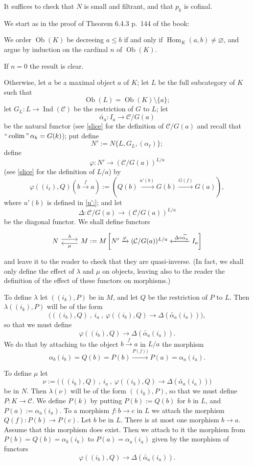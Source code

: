 \documentclass[12pt]{article}%
\theoremstyle{remark}
\theoremstyle{definition}
\newcommand{\C}{\mathcal C}
\newcommand{\pp}{\varphi}
\newcommand{\xr}{\xrightarrow}
\DeclareMathOperator*{\colim}{colim}
\DeclareMathOperator*{\ic}{``\colim"}
\DeclareMathOperator{\Hom}{Hom}%
\DeclareMathOperator{\Ind}{Ind}
\DeclareMathOperator{\Ob}{Ob}
\begin{document}
It suffices to check that $N$ is small and filtrant, and that $p_k$ is cofinal. 

We start as in the proof of Theorem 6.4.3 p.~144 of the book: 

We order $\Ob(K)$ be decreeing $a\le b$ if and only if $\Hom_K(a,b)\neq\varnothing$, and argue by induction on the cardinal $n$ of $\Ob(K)$. 

If $n=0$ the result is clear.

Otherwise, let $a$ be a maximal object $a$ of $K$; let $L$ be the full subcategory of $K$ such that 
$$
\Ob(L)=\Ob(K)\setminus\{a\};
$$ 
let $G_L:L\to\Ind(\C)$ be the restriction of $G$ to $L$; let 
$$
\widetilde{\alpha_a}:I_a\to\C/G(a)
$$ 
be the natural functor (see \eqref{slice} for the definition of $\C/G(a)$ and recall that $\ic\alpha_k=G(k)$); put define 
$$
N':=N\{L,G_L,(\alpha_\ell)\};
$$
define 
$$ 
\varphi:N'\to(\C/G(a))^{L/a} 
$$ 
(see \eqref{slice} for the definition of $L/a$) by 
$$
\varphi((i_\ell),Q)\left(b\xr f a\right):=\left(Q(b)\xr{u'(b)} G(b)\xr{G(f)}G(a)\right),
$$
where $u'(b)$ is defined in \eqref{u':}; and let 
$$
\Delta:\C/G(a)\to(\C/G(a))^{L/a}
$$ 
be the diagonal functor. We shall define functors 
$$
\begin{tikzcd}
N\ar[yshift=0.7ex]{r}{\lambda}&M:=M\left[N'\xrightarrow{\varphi}(\C/G(a))^{L/a}\xleftarrow{\ \Delta\circ\widetilde{\alpha_a}}I_a\right]\ar[yshift=-0.7ex]{l}{\mu}
\end{tikzcd}
$$ 
and leave it to the reader to check that they are quasi-inverse. (In fact, we shall only define the effect of $\lambda$ and $\mu$ on objects, leaving also to the reader the definition of the effect of these functors on morphisms.)

To define $\lambda$ let $((i_k),P)$ be in $M$, and let $Q$ be the restriction of $P$ to $L$. Then $\lambda((i_k),P)$ will be of the form 
$$
\Big(((i_b),Q)\ ,\ i_a\ ,\ \pp((i_b),Q)\to\Delta(\widetilde{\alpha_a}(i_a))\Big),
$$ 
so that we must define 
$$
\pp((i_b),Q)\to\Delta(\widetilde{\alpha_a}(i_a)).
$$ 
We do that by attaching to the object $b\xr f a$ in $L/a$ the morphism 
$$
\alpha_b(i_b)=Q(b)=P(b)\xr{P(f))}P(a)=\alpha_a(i_a).
$$

To define $\mu$ let 
$$
\nu:=\Big(((i_b),Q)\ ,\ i_a\ ,\ \pp((i_b),Q)\to\Delta(\widetilde{\alpha_a}(i_a))\Big)
$$ 
be in $N$. Then $\lambda(\nu)$ will be of the form $((i_k),P)$, so that we must define $P:K\to\C$. We define $P(k)$ by putting $P(b):=Q(b)$ for $b$ in $L$, and $P(a):=\alpha_a(i_a)$. To a morphism $f:b\to c$ in $L$ we attach the morphism $Q(f):P(b)\to P(c)$. Let $b$ be in $L$. There is at most one morphism $b\to a$. Assume that this morphism does exist. Then we attach to it the morphism from $P(b)=Q(b)=\alpha_b(i_b)$ to $P(a)=\alpha_a(i_a)$ given by the morphism of functors 
$$
\pp((i_b),Q)\to\Delta(\widetilde{\alpha_a}(i_a)).
$$
\end{document}
